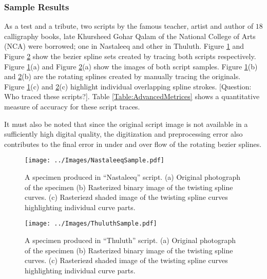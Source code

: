 \subsubsection{Sample Results}
As a test and a tribute, two scripts by the famous teacher, artist and author of $18$ calligraphy books, late Khursheed Gohar Qalam \cite{bib23} of the National College of Arts (NCA) were borrowed; one in Nastaleeq and other in Thuluth. Figure \ref{Fig:Nastaleeq} and Figure \ref{Fig:Thuluth} show the bezier spline sets created by tracing both scripts respectively. Figure \ref{Fig:Nastaleeq}(a) and Figure \ref{Fig:Thuluth}(a) show the images of both script samples. Figure \ref{Fig:Nastaleeq}(b) and \ref{Fig:Thuluth}(b) are the rotating splines created by manually tracing the originals. Figure \ref{Fig:Nastaleeq}(c) and \ref{Fig:Thuluth}(c) highlight individual overlapping spline strokes. [Question: Who traced these scripts?]. Table \ref{Table:AdvancedMetrices} shows a quantitative measure of accuracy for these script traces.

It must also be noted that since the original script image is not available in a sufficiently high digital quality, the digitization and preprocessing error also contributes to the final error in under and over flow of the rotating bezier splines.

    \begin{figure}[!t]
    \centering
    \texttt{[image: ../Images/NastaleeqSample.pdf]}
      \caption{
        A specimen produced in ``Nastaleeq'' script. (a) Original photograph of the specimen (b) Rasterized binary image of the twisting spline curves. (c) Rasteriezd shaded image of the twisting spline curves highlighting individual curve parts.}
      \label{Fig:Nastaleeq}
    \end{figure}


    \begin{figure}[!t]
    \centering
    \texttt{[image: ../Images/ThuluthSample.pdf]}
    \caption{
        A specimen produced in ``Thuluth'' script. (a) Original photograph of the specimen (b) Rasterized binary image of the twisting spline curves. (c) Rasteriezd shaded image of the twisting spline curves highlighting individual curve parts.
    }
  \label{Fig:Thuluth}
\end{figure}

